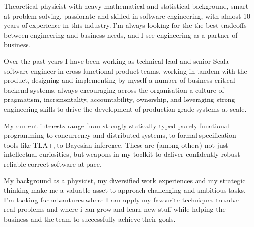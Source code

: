 
\begin{cvparagraph}
Theoretical physicist with heavy mathematical and statistical 
background, smart at problem-solving, passionate and skilled in software engineering, with almost 10 years of experience in this industry. 
I'm always looking for the the best tradeoffs between engineering and business needs, and I see engineering as a partner of business. 

  Over the past years I have been working as technical lead and senior Scala software engineer in cross-functional product teams, working in tandem with the product, designing and implementing by myself a number of business-critical backend systems, always encouraging across the organisation a culture of pragmatism, incrementality, accountability, ownership, and leveraging strong engineering skills 
  to drive the development of production-grade systems at scale. 

  My current interests range from strongly statically typed purely functional programming to concurrency and distributed systems, to formal specification tools like TLA+, to Bayesian inference. These are (among others) not just intellectual curiosities, but weapons in my toolkit to deliver confidently robust reliable correct software at pace. 

My background as a physicist, my diversified work experiences and my strategic thinking make me a valuable asset to approach challenging and ambitious tasks. I'm looking for advantures where I can apply my favourite techniques to solve real problems and where i can grow and learn new stuff while helping the business and the team to successfully achieve their goals. 
\end{cvparagraph}
